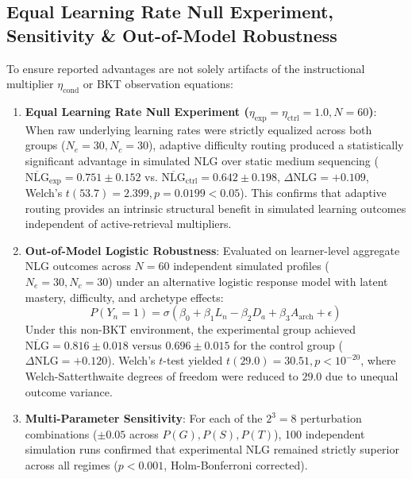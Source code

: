 \documentclass[journal]{IEEEtran}
\begin{document}
\subsection{Equal Learning Rate Null Experiment, Sensitivity \& Out-of-Model Robustness}
To ensure reported advantages are not solely artifacts of the instructional multiplier $\eta_{\text{cond}}$ or BKT observation equations:
\begin{enumerate}
    \item \textbf{Equal Learning Rate Null Experiment ($\eta_{\text{exp}} = \eta_{\text{ctrl}} = 1.0, N=60$)}: When raw underlying learning rates were strictly equalized across both groups ($N_e=30, N_c=30$), adaptive difficulty routing produced a statistically significant advantage in simulated NLG over static medium sequencing ($\overline{\text{NLG}}_{\text{exp}} = 0.751 \pm 0.152$ vs. $\overline{\text{NLG}}_{\text{ctrl}} = 0.642 \pm 0.198$, $\Delta\text{NLG} = +0.109$, Welch's $t(53.7) = 2.399, p = 0.0199 < 0.05$). This confirms that adaptive routing provides an intrinsic structural benefit in simulated learning outcomes independent of active-retrieval multipliers.
    \item \textbf{Out-of-Model Logistic Robustness}: Evaluated on learner-level aggregate NLG outcomes across $N=60$ independent simulated profiles ($N_e=30, N_c=30$) under an alternative logistic response model with latent mastery, difficulty, and archetype effects:
    \begin{equation}
    P(Y_n = 1) = \sigma(\beta_0 + \beta_1 L_n - \beta_2 D_a + \beta_3 A_{\text{arch}} + \epsilon)
    \end{equation}
    Under this non-BKT environment, the experimental group achieved $\overline{\text{NLG}} = 0.816 \pm 0.018$ versus $0.696 \pm 0.015$ for the control group ($\Delta \text{NLG} = +0.120$). Welch's $t$-test yielded $t(29.0) = 30.51, p < 10^{-20}$, where Welch-Satterthwaite degrees of freedom were reduced to $29.0$ due to unequal outcome variance.
    \item \textbf{Multi-Parameter Sensitivity}: For each of the $2^3 = 8$ perturbation combinations ($\pm 0.05$ across $P(G), P(S), P(T)$), 100 independent simulation runs confirmed that experimental NLG remained strictly superior across all regimes ($p < 0.001$, Holm-Bonferroni corrected).
\end{enumerate}
\end{document}
